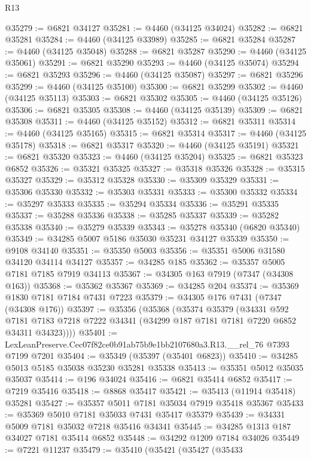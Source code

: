 \begin{lexlean}{R13}
\begin{coremodule}
@35279 := @6821 @34127
@35281 := @4460 (@34125 @34024)
@35282 := @6821 @35281
@35284 := @4460 (@34125 @33989)
@35285 := @6821 @35284
@35287 := @4460 (@34125 @35048)
@35288 := @6821 @35287
@35290 := @4460 (@34125 @35061)
@35291 := @6821 @35290
@35293 := @4460 (@34125 @35074)
@35294 := @6821 @35293
@35296 := @4460 (@34125 @35087)
@35297 := @6821 @35296
@35299 := @4460 (@34125 @35100)
@35300 := @6821 @35299
@35302 := @4460 (@34125 @35113)
@35303 := @6821 @35302
@35305 := @4460 (@34125 @35126)
@35306 := @6821 @35305
@35308 := @4460 (@34125 @35139)
@35309 := @6821 @35308
@35311 := @4460 (@34125 @35152)
@35312 := @6821 @35311
@35314 := @4460 (@34125 @35165)
@35315 := @6821 @35314
@35317 := @4460 (@34125 @35178)
@35318 := @6821 @35317
@35320 := @4460 (@34125 @35191)
@35321 := @6821 @35320
@35323 := @4460 (@34125 @35204)
@35325 := @6821 @35323 @6852
@35326 := @35321 @35325
@35327 := @35318 @35326
@35328 := @35315 @35327
@35329 := @35312 @35328
@35330 := @35309 @35329
@35331 := @35306 @35330
@35332 := @35303 @35331
@35333 := @35300 @35332
@35334 := @35297 @35333
@35335 := @35294 @35334
@35336 := @35291 @35335
@35337 := @35288 @35336
@35338 := @35285 @35337
@35339 := @35282 @35338
@35340 := @35279 @35339
@35343 := @35278 @35340 (@6820 @35340)
@35349 := @34285 @5007 @5186 @35030 @35231 @34127 @35339
@35350 := @9108 @34140
@35351 := @35350 @5003
@35356 := @35351 @5006 @31580 @34120 @34114 @34127
@35357 := @34285 @185
@35362 := @35357 @5005 @7181 @7185 @7919 @34113
@35367 := @34305 @163 @7919 (@7347 (@34308 @163))
@35368 := @35362 @35367
@35369 := @34285 @204
@35374 := @35369 @1830 @7181 @7184 @7431 @7223
@35379 := @34305 @176 @7431 (@7347 (@34308 @176))
@35397 := @35356
    (@35368
      (@35374
        @35379
        (@34331
          @592
          @7181
          @7183
          @7218
          @7222
          @34341
          (@34299 @187 @7181 @7181 @7220 @6852 @34311 @34323))))
@35401 := LexLeanPreserve.Cec07f82ce0b91ab75b9e1bb2107680a3.R13.__rel_76 @7393 @7199 @7201
@35404 := @35349 (@35397 (@35401 @6823))
@35410 := @34285 @5013 @5185 @35038 @35230 @35281 @35338
@35413 := @35351 @5012 @35035 @35037
@35414 := @196 @34024
@35416 := @6821 @35414 @6852
@35417 := @7219 @35416
@35418 := @8868 @35417
@35421 := @35413 (@11914 @35418) @35281
@35427 := @35357 @5011 @7181 @35034 @7919 @35418 @35367
@35433 := @35369 @5010 @7181 @35033 @7431 @35417 @35379
@35439 := @34331 @5009 @7181 @35032 @7218 @35416 @34341
@35445 := @34285 @1313 @187 @34027 @7181 @35414 @6852
@35448 := @34292 @1209 @7184 @34026
@35449 := @7221 @11237
@35479 := @35410
    (@35421
      (@35427
        (@35433

\end{coremodule}
\end{lexlean}
